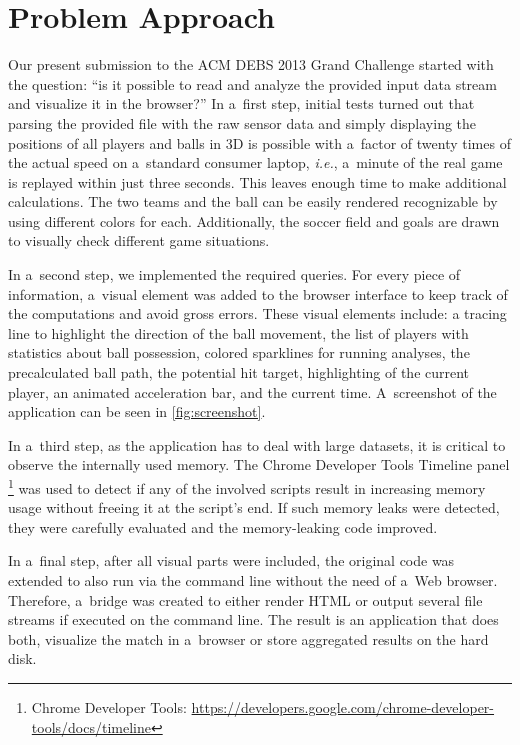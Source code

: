 \documentclass{sig-alternate}
\newcommand{\inlinelistingsize}{\fontsize{8pt}{11pt}}
\let\oldurl\url
\renewcommand{\url}[1]{\inlinelistingsize\oldurl{#1}}
\begin{document}
\section{Problem Approach}
\label{sec:methodology}

Our present submission to the ACM DEBS 2013 Grand Challenge
started with the question: ``is it possible to read and analyze
the provided input data stream and visualize it in the browser?''
In a~first step, initial tests turned out that
parsing the provided file with the raw sensor data
and simply displaying the positions of all players
and balls in 3D is possible with a~factor of twenty times of the actual speed on a~standard consumer laptop,
\emph{i.e.}, a~minute of the real game is replayed
within just three seconds.
This leaves enough time to make additional calculations.
The two teams and the ball can be easily rendered recognizable
by using different colors for each.
Additionally, the soccer field and goals are drawn
to visually check different game situations.

In a~second step, we implemented the required queries.
For every piece of information, a~visual element was added
to the browser interface to keep track of the computations
and avoid gross errors.
These visual elements include:
a tracing line to highlight the direction of the ball movement,  
the list of players with statistics about ball possession,
colored sparklines for running analyses,
the precalculated ball path, the potential hit target,
highlighting of the current player,
an animated acceleration bar,
and the current time.
A~screenshot of the application can be seen in
\autoref{fig:screenshot}.

In a~third step, as the application has to deal with large datasets,
it is critical to observe the internally used memory.
The Chrome Developer Tools Timeline panel%
\footnote{Chrome Developer Tools: \url{https://developers.google.com/chrome-developer-tools/docs/timeline}}
was used
to detect if any of the involved scripts
result in increasing memory usage without freeing it at the script's end.
If such memory leaks were detected, they were carefully evaluated and the memory-leaking code improved.

In a~final step, after all visual parts were included,
the original code was extended to also run
via the command line without the need of a~Web browser.
Therefore, a~bridge was created to either render HTML
or output several file streams if executed on the command line.
The result is an application that does both,
visualize the match in a~browser or store aggregated results
on the hard disk.
\end{document}
